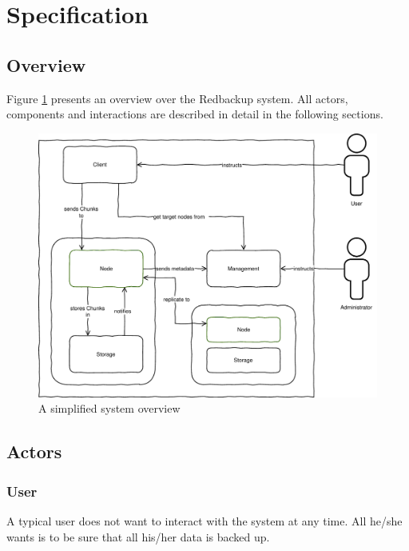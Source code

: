 
\section{Specification}\label{sec:specification}

\subsection{Overview}
Figure \ref{fig:architecture-overview} presents an overview over the Redbackup \gls{system}. All actors, components and interactions are described in detail in the following sections.

\begin{figure}[h]
    \centering
    \includegraphics[width=1\linewidth]{resources/architecture_overview}
    \caption{A simplified \gls{system} overview}
    \label{fig:architecture-overview}
\end{figure}

\subsection{Actors}

\subsubsection{User}
A typical \gls{user} does not want to interact with the \gls{system} at any time. All he/she wants is to be sure that all his/her data is backed up.

